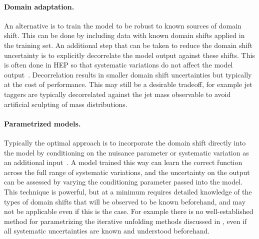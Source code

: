 \paragraph{Domain adaptation.}
An alternative is to train the model to be robust to known sources of domain shift.
This can be done by including data with known domain shifts applied in the training set.
An additional step that can be taken to reduce the domain shift uncertainty is to explicitly decorrelate the model output against these shifts.
This is often done in HEP so that systematic variations do not affect the model output~\cite{Kasieczka:2020yyl,ATLAS:2025dkv,Ghosh:2021hrh}.
Decorrelation results in smaller domain shift uncertainties but typically at the cost of performance.
This may still be a desirable tradeoff, for example jet taggers are typically decorrelated against the jet mass observable to avoid artificial sculpting of mass distributions.


\paragraph{Parametrized models.}
Typically the optimal approach is to incorporate the domain shift directly into the model by conditioning on the nuisance parameter or systematic variation as an additional input~\cite{Louppe:2016ylz,Baldi:2016fzo,Ghosh:2021roe}.
A model trained this way can learn the correct function across the full range of systematic variations, and the uncertainty on the output can be assessed by varying the conditioning parameter passed into the model.
This technique is powerful, but at a minimum requires detailed knowledge of the types of domain shifts that will be observed to be known beforehand, and may not be applicable even if this is the case.
For example there is no well-established method for parametrizing the iterative unfolding methods discussed in , even if all systematic uncertainties are known and understood beforehand.
